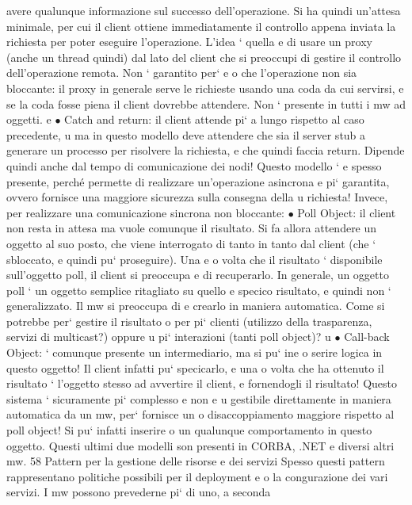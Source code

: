 \documentclass[a4paper,12pt]{article}
\begin{document}
avere qualunque informazione sul successo dell'operazione. Si ha quindi
un'attesa minimale, per cui il client ottiene immediatamente il controllo
appena inviata la richiesta per poter eseguire l'operazione. L'idea ` quella
e
di usare un proxy (anche un thread quindi) dal lato del client che si preoccupi di gestire il controllo dell'operazione
remota. Non ` garantito per`
e
o
che l'operazione non sia bloccante: il proxy in generale serve le richieste
usando una coda da cui servirsi, e se la coda fosse piena il client dovrebbe
attendere. Non ` presente in tutti i mw ad oggetti.
e
$\bullet$ Catch and return: il client attende pi` a lungo rispetto al caso precedente,
u
ma in questo modello deve attendere che sia il server stub a generare un
processo per risolvere la richiesta, e che quindi faccia return. Dipende
quindi anche dal tempo di comunicazione dei nodi! Questo modello `
e
spesso presente, perché permette di realizzare un'operazione asincrona
e
pi` garantita, ovvero fornisce una maggiore sicurezza sulla consegna della
u
richiesta!
Invece, per realizzare una comunicazione sincrona non bloccante:
$\bullet$ Poll Object: il client non resta in attesa ma vuole comunque il risultato.
Si fa allora attendere un oggetto al suo posto, che viene interrogato di
tanto in tanto dal client (che ` sbloccato, e quindi pu` proseguire). Una
e
o
volta che il risultato ` disponibile sull'oggetto poll, il client si preoccupa
e
di recuperarlo.
In generale, un oggetto poll ` un oggetto semplice ritagliato su quello
e
specico risultato, e quindi non ` generalizzato. Il mw si preoccupa di
e
crearlo in maniera automatica. Come si potrebbe per` gestire il risultato
o
per pi` clienti (utilizzo della trasparenza, servizi di multicast?) oppure
u
pi` interazioni (tanti poll object)?
u
$\bullet$ Call-back Object: ` comunque presente un intermediario, ma si pu` ine
o
serire logica in questo oggetto! Il client infatti pu` specicarlo, e una
o
volta che ha ottenuto il risultato ` l'oggetto stesso ad avvertire il client,
e
fornendogli il risultato! Questo sistema ` sicuramente pi` complesso e non
e
u
gestibile direttamente in maniera automatica da un mw, per` fornisce un
o
disaccoppiamento maggiore rispetto al poll object! Si pu` infatti inserire
o
un qualunque comportamento in questo oggetto.
Questi ultimi due modelli son presenti in CORBA, .NET e diversi altri mw.
58
Pattern per la gestione delle risorse e dei servizi
Spesso questi pattern rappresentano politiche possibili per il deployment e o la
congurazione dei vari servizi. I mw possono prevederne pi` di uno, a seconda
\end{document}
